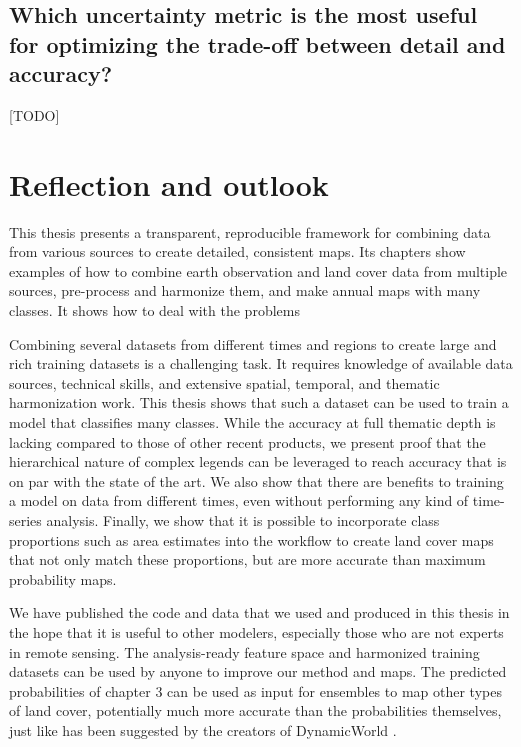     \subsection{Which uncertainty metric is the most useful for optimizing the trade-off between detail and accuracy?}
    \label{syn:rq5}

    [TODO]


\section{Reflection and outlook}

    This thesis presents a transparent, reproducible framework for combining data from various sources to create detailed, consistent maps. Its chapters show examples of how to combine earth observation and land cover data from multiple sources, pre-process and harmonize them, and make annual maps with many classes. It shows how to deal with the problems
    
    Combining several datasets from different times and regions to create large and rich training datasets is a challenging task. It requires knowledge of available data sources, technical skills, and extensive spatial, temporal, and thematic harmonization work. This thesis shows that such a dataset can be used to train a model that classifies many classes. While the accuracy at full thematic depth is lacking compared to those of other recent products, we present proof that the hierarchical nature of complex legends can be leveraged to reach accuracy that is on par with the state of the art. We also show that there are  benefits to training a model on data from different times, even without performing any kind of time-series analysis. Finally, we show that it is possible to incorporate class proportions such as area estimates into the workflow to create land cover maps that not only match these proportions, but are more accurate than maximum probability maps.

    We have published the code and data that we used and produced in this thesis in the hope that it is useful to other modelers, especially those who are not experts in remote sensing. The analysis-ready feature space and harmonized training datasets can be used by anyone to improve our method and maps. The predicted probabilities of chapter 3 can be used as input for ensembles to map other types of land cover, potentially much more accurate than the probabilities themselves, just like has been suggested by the creators of DynamicWorld \citep{brown2022dynamic}.

